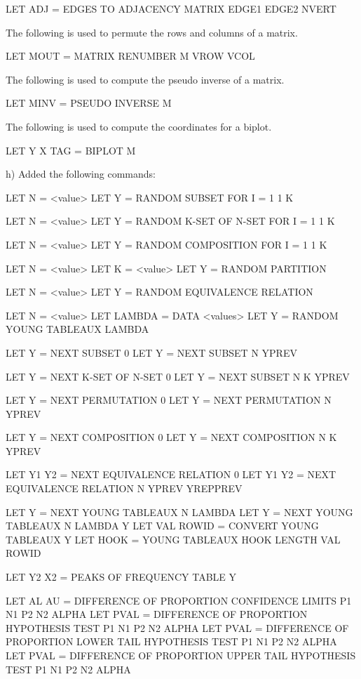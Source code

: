 {          LET ADJ = EDGES TO ADJACENCY MATRIX EDGE1 EDGE2 NVERT
          
       The following is used to permute the rows and columns
       of a matrix.

          LET MOUT = MATRIX RENUMBER M  VROW VCOL
          
       The following is used to compute the pseudo inverse
       of a matrix.

          LET MINV = PSEUDO INVERSE M

       The following is used to compute the coordinates for a
       biplot.

          LET Y X TAG = BIPLOT M

    h) Added the following commands:

          LET N = <value>
          LET Y = RANDOM SUBSET FOR I = 1 1 K
  
          LET N = <value>
          LET Y = RANDOM K-SET OF N-SET FOR I = 1 1 K
  
          LET N = <value>
          LET Y = RANDOM COMPOSITION FOR I = 1 1 K

          LET N = <value>
          LET K = <value>
          LET Y = RANDOM PARTITION

          LET N = <value>
          LET Y = RANDOM EQUIVALENCE RELATION

          LET N = <value>
          LET LAMBDA = DATA <values>
          LET Y = RANDOM YOUNG TABLEAUX LAMBDA

          LET Y = NEXT SUBSET 0
          LET Y = NEXT SUBSET N YPREV

          LET Y = NEXT K-SET OF N-SET 0
          LET Y = NEXT SUBSET N K YPREV

          LET Y = NEXT PERMUTATION 0
          LET Y = NEXT PERMUTATION N YPREV

          LET Y = NEXT COMPOSITION 0
          LET Y = NEXT COMPOSITION N K YPREV

          LET Y1 Y2 = NEXT EQUIVALENCE RELATION 0
          LET Y1 Y2 = NEXT EQUIVALENCE RELATION N YPREV YREPPREV

          LET Y = NEXT YOUNG TABLEAUX N LAMBDA
          LET Y = NEXT YOUNG TABLEAUX N LAMBDA Y
          LET VAL ROWID = CONVERT YOUNG TABLEAUX Y
          LET HOOK = YOUNG TABLEAUX HOOK LENGTH VAL ROWID

          LET Y2 X2 = PEAKS OF FREQUENCY TABLE Y

          LET AL AU = DIFFERENCE OF PROPORTION CONFIDENCE
                      LIMITS P1 N1 P2 N2 ALPHA
          LET PVAL  = DIFFERENCE OF PROPORTION HYPOTHESIS
                      TEST P1 N1 P2 N2 ALPHA
          LET PVAL  = DIFFERENCE OF PROPORTION LOWER TAIL
                      HYPOTHESIS TEST P1 N1 P2 N2 ALPHA
          LET PVAL  = DIFFERENCE OF PROPORTION UPPER TAIL
                      HYPOTHESIS TEST P1 N1 P2 N2 ALPHA

}
